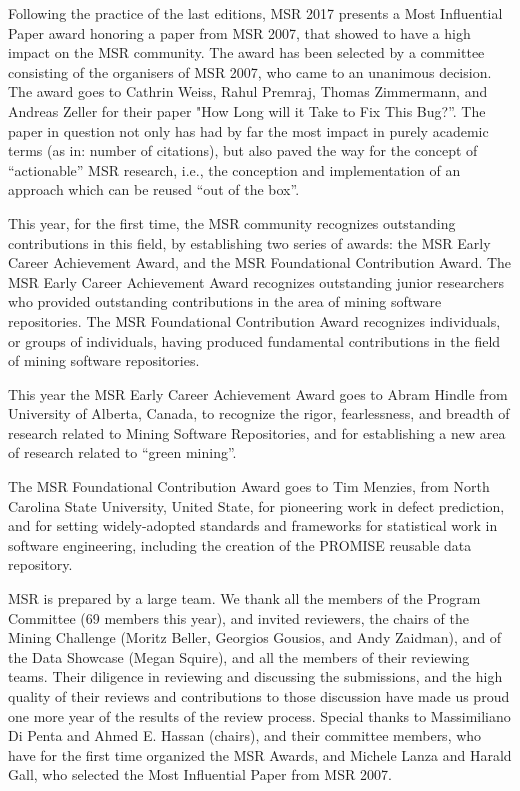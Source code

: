 \documentclass[a4paper]{report}
\begin{document}
Following the practice of the last editions, MSR 2017 presents a Most Influential Paper award honoring a paper from MSR 2007, that showed to have a high impact on the MSR community. The award has been selected by a committee consisting of the organisers of MSR 2007, who came to an unanimous decision. The award goes to Cathrin Weiss, Rahul Premraj, Thomas Zimmermann, and Andreas Zeller for their paper "How Long will it Take to Fix This Bug?”. The paper in question not only has had by far the most impact in purely academic terms (as in: number of citations), but also paved the way for the concept of “actionable” MSR research, i.e., the conception and implementation of an approach which can be reused “out of the box”.

This year, for the first time, the MSR community recognizes outstanding contributions in this field, by establishing two series of awards: the MSR Early Career Achievement Award, and the MSR Foundational Contribution Award. The MSR Early Career Achievement Award recognizes outstanding junior researchers who provided outstanding contributions in the area of mining software repositories. The MSR Foundational Contribution Award recognizes individuals, or groups of individuals, having produced fundamental contributions in the field of mining software repositories.

This year the MSR Early Career Achievement Award goes to Abram Hindle from University of Alberta, Canada, to recognize the rigor, fearlessness, and breadth of research related to Mining Software Repositories, and for establishing a new area of research related to “green mining”.

The MSR Foundational Contribution Award goes to Tim Menzies, from North Carolina State University, United State, for pioneering work in defect prediction, and for setting widely-adopted standards and frameworks for statistical work in software engineering, including the creation of the PROMISE reusable data repository.

MSR is prepared by a large team. We thank all the members of the Program Committee (69 members this year), and invited reviewers, the chairs of the Mining Challenge (Moritz Beller, Georgios Gousios, and Andy Zaidman), and of the Data Showcase (Megan Squire), and all the members of their reviewing teams. Their diligence in reviewing and discussing the submissions, and the high quality of their reviews and contributions to those discussion have made us proud one more year of the results of the review process. Special thanks to Massimiliano Di Penta and Ahmed E. Hassan (chairs), and their committee members, who have for the first time organized the MSR Awards, and Michele Lanza and Harald Gall, who selected the Most Influential Paper from MSR 2007.
\end{document}

